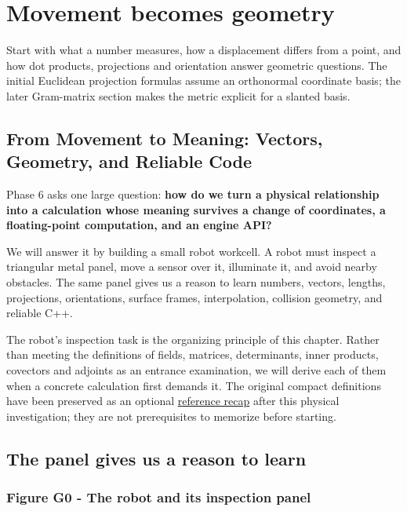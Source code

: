 \section{Movement becomes geometry}\label{movement-becomes-geometry}

Start with what a number measures, how a displacement differs from a point, and how dot products, projections and orientation answer geometric questions. The initial Euclidean projection formulas assume an orthonormal coordinate basis; the later Gram-matrix section makes the metric explicit for a slanted basis.

\subsection{From Movement to Meaning: Vectors, Geometry, and Reliable Code}\label{from-movement-to-meaning-vectors-geometry-and-reliable-code}

Phase 6 asks one large question: \textbf{how do we turn a physical relationship into a calculation whose meaning survives a change of coordinates, a floating-point computation, and an engine API?}

We will answer it by building a small robot workcell. A robot must inspect a triangular metal panel, move a sensor over it, illuminate it, and avoid nearby obstacles. The same panel gives us a reason to learn numbers, vectors, lengths, projections, orientations, surface frames, interpolation, collision geometry, and reliable C++.

The robot's inspection task is the organizing principle of this chapter. Rather than meeting the definitions of fields, matrices, determinants, inner products, covectors and adjoints as an entrance examination, we will derive each of them when a concrete calculation first demands it. The original compact definitions have been preserved as an optional \hyperref[01-foundations-i-ch018]{reference recap} after this physical investigation; they are not prerequisites to memorize before starting.

\subsection{The panel gives us a reason to learn}\label{the-panel-gives-us-a-reason-to-learn}

\subsubsection{Figure G0 - The robot and its inspection panel}\label{figure-g0---the-robot-and-its-inspection-panel}

